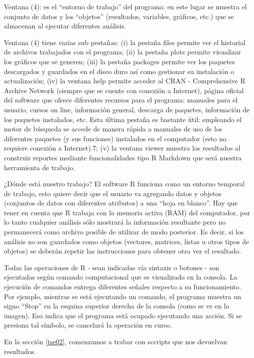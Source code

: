 \documentclass[
]{book}
\begin{document}
Ventana (4): es el ``entorno de trabajo'' del programa: en este lugar se muestra el conjunto de datos y los ``objetos'' (resultados, variables, gráficos, etc.) que se almacenan al ejecutar diferentes análisis.

Ventana (4) tiene varias sub pestañas: (i) la pestaña files permite ver el historial de archivos trabajados con el programa; (ii) la pestaña plots permite visualizar los gráficos que se generen; (iii) la pestaña packages permite ver los paquetes descargados y guardados en el disco duro así como gestionar su instalación o actualización; (iv) la ventana help permite acceder al CRAN - Comprehensive R Archive Network (siempre que se cuente con conexión a Internet), página oficial del software que ofrece diferentes recursos para el programa: manuales para el usuario, cursos on line, información general, descarga de paquetes, información de los paquetes instalados, etc. Esta última pestaña es bastante útil: empleando el motor de búsqueda se accede de manera rápida a manuales de uso de los diferentes paquetes (y sus funciones) instalados en el computador (esto no requiere conexión a Internet).7; (v) la ventana viewer muestra los resultados al construir reportes mediante funcionalidades tipo R Markdown que será nuestra herramienta de trabajo.

¿Dónde está nuestro trabajo? El software R funciona como un entorno temporal de trabajo, esto quiere decir que el usuario va agregando datos y objetos (conjuntos de datos con diferentes atributos) a una ``hoja en blanco''. Hay que tener en cuenta que R trabaja con la memoria activa (RAM) del computador, por lo tanto cualquier análisis sólo mostrará la información resultante pero no permanecerá como archivo posible de utilizar de modo posterior. Es decir, si los análisis no son guardados como objetos (vectores, matrices, listas u otros tipos de objetos) se deberán repetir las instrucciones para obtener otra vez el resultado.

Todas las operaciones de R - sean indicadas vía sintaxis o botones - son ejecutadas según comando computacional que es visualizado en la consola. La ejecución de comandos entrega diferentes señales respecto a su funcionamiento. Por ejemplo, mientras se está ejecutando un comando, el programa muestra un signo ``Stop'' en la esquina superior derecha de la consola (como se ve en la imagen). Eso indica que el programa está ocupado ejecutando una acción. Si se presiona tal símbolo, se cancelará la operación en curso.

En la sección \ref{tse02}, comenzamos a trabar con sccripts que nos devuelvan resultados.
\end{document}
